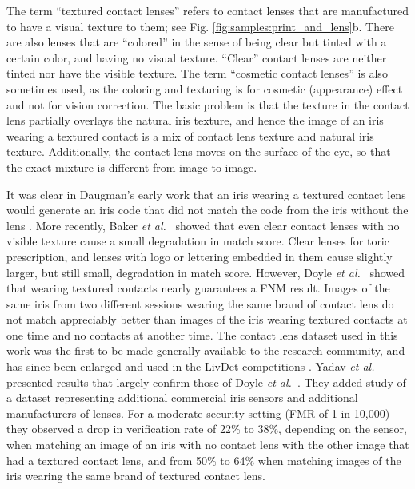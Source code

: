 \documentclass[format=acmsmall, review=false, timestamp=false]{acmart}
\newcommand{\etal}{{\it et al.}~}
\begin{document}
The term ``textured contact lenses'' refers to contact lenses that are manufactured to have a visual texture to them; see Fig.  \ref{fig:samples:print_and_lens}b. There are also lenses that are ``colored'' in the sense of being clear but tinted with a certain color, and having no visual texture. ``Clear'' contact lenses are neither tinted nor have the visible texture. The term ``cosmetic contact lenses'' is also sometimes used, as the coloring and texturing is for cosmetic (appearance) effect and not for vision correction. The basic problem is that the texture in the contact lens partially overlays the natural iris texture, and hence the image of an iris wearing a textured contact is a mix of contact lens texture and natural iris texture. Additionally, the contact lens moves on the surface of the eye, so that the exact mixture is different from image to image.

It was clear in Daugman's early work that an iris wearing a textured contact lens would generate an iris code that did not match the code from the iris without the lens \cite{Daugman_WMIP_2003}. More recently, Baker \etal \cite{Baker_BTAS_2009, Baker_CVIU_2010} showed that even clear contact lenses with no visible texture cause a small degradation in match score. Clear lenses for toric prescription, and lenses with logo or lettering embedded in them cause slightly larger, but still small, degradation in match score. However, Doyle \etal \cite{Doyle_ICB_2013} showed that wearing textured contacts nearly guarantees a FNM result. Images of the same iris from two different sessions wearing the same brand of contact lens do not match appreciably better than images of the iris wearing textured contacts at one time and no contacts at another time. The contact lens dataset used in this work was the first to be made generally available to the research community, and has since been enlarged and used in the LivDet competitions \cite{Yambay_IJCB_2014,Yambay_IJCB_2017}. Yadav \etal \cite{Yadav_TIFS_2014} presented results that largely confirm those of Doyle \etal \cite{Doyle_ICB_2013}. They added study of a dataset representing additional commercial iris sensors and additional manufacturers of lenses. For a moderate security setting (FMR of 1-in-10,000) they observed a drop in verification rate of 22\% to 38\%, depending on the sensor, when matching an image of an iris with no contact lens with the other image that had a textured contact lens, and from 50\% to 64\% when matching images of the iris wearing the same brand of textured contact lens. 
\end{document}
